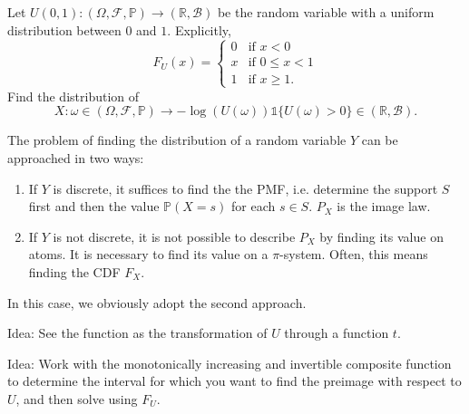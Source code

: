 	\begin{my_ex}
	Let $U(0,1):(\Omega,\mathcal{F},\mathbb{P}) \to (\mathbb{R},\mathcal{B})$ be the random variable with a uniform distribution between $0$ and $1$.
	Explicitly,
	\[
		F_U(x)=
		\begin{cases}
			0 & \text{if } x < 0 \\
			x & \text{if } 0 \leq x < 1 \\
			1 & \text{if } x \geq 1.
		\end{cases}	
	\]
	Find the distribution of
	\[
		X : 
		\omega 
		\in (\Omega,\mathcal{F},\mathbb{P}) 
		\to  
		- \log ( U( \omega ) ) \mathbb{1} \{U( \omega ) > 0\} 
		\in (\mathbb{R},\mathcal{B}).	
	\]
	\end{my_ex}
	\begin{my_remark}
	The problem of finding the distribution of a random variable $Y$ can be approached in two ways:
	\begin{enumerate}
		\item If $Y$ is discrete, it suffices to find the the PMF, i.e. determine the support $S$ first and then the value $\mathbb{P} (X = s)$ for each $s \in S$. $P_X$ is the image law.
		\item If $Y$ is not discrete, it is not possible to describe $P_X$ by finding its value on atoms. It is necessary to find its value on a $\pi$-system. Often, this means finding the CDF $F_X$.
	\end{enumerate}
	In this case, we obviously adopt the second approach.
	
	Idea: See the function as the transformation of $U$ through a function $t$.
	
	Idea: Work with the monotonically increasing and invertible composite function to determine the interval for which you want to find the preimage with respect to $U$, and then solve using $F_U$.
	\end{my_remark}
	